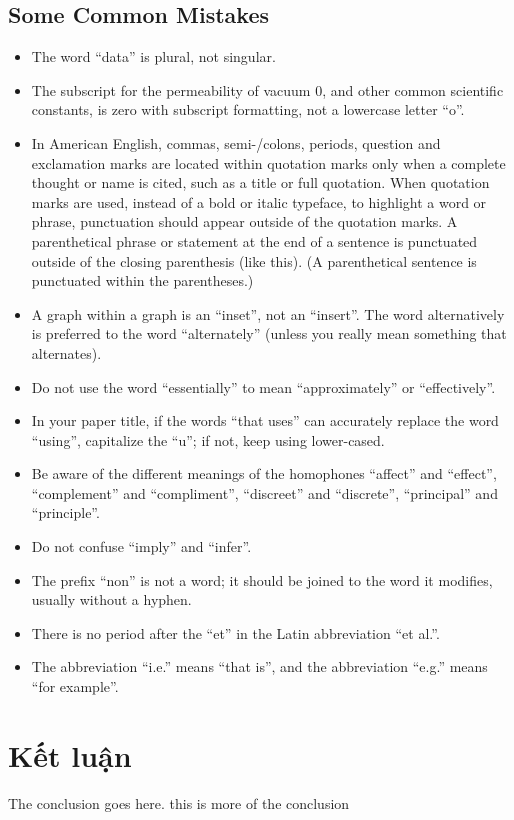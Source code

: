 \documentclass[10pt, conference, a4paper, compsocconf]{IEEEtran}
\begin{document}
\subsection{Some Common Mistakes}
\begin{itemize}
\item The word “data” is plural, not singular.
\item The subscript for the permeability of vacuum 0, and other common scientific constants, is zero with subscript formatting, not a lowercase letter “o”.
\item In American English, commas, semi-/colons, periods, question and exclamation marks are located within quotation marks only when a complete thought or name is cited, such as a title or full quotation. When quotation marks are used, instead of a bold or italic typeface, to highlight a word or phrase, punctuation should appear outside of the quotation marks. A parenthetical phrase or statement at the end of a sentence is punctuated outside of the closing parenthesis (like this). (A parenthetical sentence is punctuated within the parentheses.)
\item A graph within a graph is an “inset”, not an “insert”. The word alternatively is preferred to the word “alternately” (unless you really mean something that alternates).
\item Do not use the word “essentially” to mean “approximately” or “effectively”.
\item In your paper title, if the words “that uses” can accurately replace the word “using”, capitalize the “u”; if not, keep using lower-cased.
\item Be aware of the different meanings of the homophones “affect” and “effect”, “complement” and “compliment”, “discreet” and “discrete”, “principal” and “principle”.
\item Do not confuse “imply” and “infer”.
\item The prefix “non” is not a word; it should be joined to the word it modifies, usually without a hyphen.
\item There is no period after the “et” in the Latin abbreviation “et al.”.
\item The abbreviation “i.e.” means “that is”, and the abbreviation “e.g.” means “for example”.
\end{itemize}

\section{Kết luận}
The conclusion goes here. this is more of the conclusion
\end{document}
